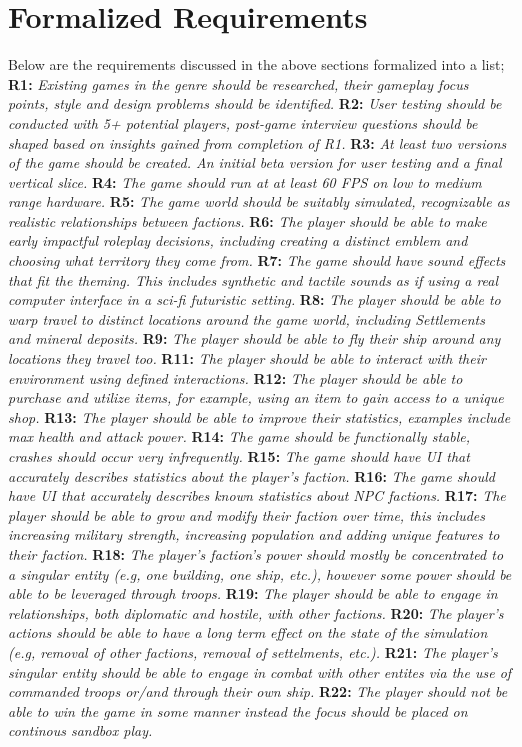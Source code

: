 \documentclass{report}
\newcommand{\req}[2]{\textbf{		#1:  }	\textit{#2}\newline\newline}
\begin{document}
\chapter{Formalized Requirements}
Below are the requirements discussed in the above sections formalized into a list;
\newline
\newline
\req{R1}{Existing games in the genre should be researched, their gameplay focus points, style and design problems should be identified.}
\req{R2}{User testing should be conducted with 5+ potential players, post-game interview questions should be shaped based on insights gained from completion of R1.}
\req{R3}{At least two versions of the game should be created. An initial beta version for user testing and a final vertical slice.}
\req{R4}{The game should run at at least 60 FPS on low to medium range hardware.}
\req{R5}{The game world should be suitably simulated, recognizable as realistic relationships between factions.}
\req{R6}{The player should be able to make early impactful roleplay decisions, including creating a distinct emblem and choosing what territory they come from.}
\req{R7}{The game should have sound effects that fit the theming. This includes synthetic and tactile sounds as if using a real computer interface in a sci-fi futuristic setting.}
\req{R8}{The player should be able to warp travel to distinct locations around the game world, including Settlements and mineral deposits.}
\req{R9}{The player should be able to fly their ship around any locations they travel too.}
\req{R11}{The player should be able to interact with their environment using defined interactions.}
\req{R12}{The player should be able to purchase and utilize items, for example, using an item to gain access to a unique shop.}
\req{R13}{The player should be able to improve their statistics, examples include max health and attack power.}
\req{R14}{The game should be functionally stable, crashes should occur very infrequently.}
\req{R15}{The game should have UI that accurately describes statistics about the player's faction.}
\req{R16}{The game should have UI that accurately describes known statistics about NPC factions.}
\req{R17}{The player should be able to grow and modify their faction over time, this includes increasing military strength, increasing population and adding unique features to their faction.}
\req{R18}{The player's faction's power should mostly be concentrated to a singular entity (e.g, one building, one ship, etc.), however some power should be able to be leveraged through troops.}
\req{R19}{The player should be able to engage in relationships, both diplomatic and hostile, with other factions.}
\req{R20}{The player's actions should be able to have a long term effect on the state of the simulation (e.g, removal of other factions, removal of settelments, etc.).}
\req{R21}{The player's singular entity should be able to engage in combat with other entites via the use of commanded troops or/and through their own ship.}
\req{R22}{The player should not be able to win the game in some manner instead the focus should be placed on continous sandbox play.}
\end{document}
